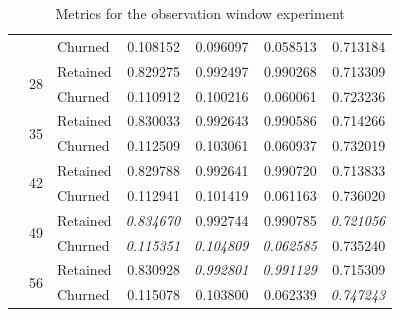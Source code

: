 \documentclass{kththesis}
\begin{document}
\begin{table}
\begin{tabular}{lllrrrr}
     &   & Churned &  0.108152 &  0.096097 &   0.058513 &  0.713184 \\
\cline{2-7}
     & \multirow{2}{*}{28} & Retained &  0.829275 &  0.992497 &   0.990268 &  0.713309 \\
     &   & Churned &  0.110912 &  0.100216 &   0.060061 &  0.723236 \\
\cline{2-7}
     & \multirow{2}{*}{35} & Retained &  0.830033 &  0.992643 &   0.990586 &  0.714266 \\
     &   & Churned &  0.112509 &  0.103061 &   0.060937 &  0.732019 \\
\cline{2-7}
     & \multirow{2}{*}{42} & Retained &  0.829788 &  0.992641 &   0.990720 &  0.713833 \\
     &   & Churned &  0.112941 &  0.101419 &   0.061163 &  0.736020 \\
\cline{2-7}
     & \multirow{2}{*}{49} & Retained &  \textit{0.834670} &  0.992744 &   0.990785 &  \textit{0.721056} \\
     &   & Churned &  \textit{0.115351} &  \textit{0.104809} &   \textit{0.062585} &  0.735240 \\
\cline{2-7}
     & \multirow{2}{*}{56} & Retained &  0.830928 &  \textit{0.992801} &   \textit{0.991129} &  0.715309 \\
     &   & Churned &  0.115078 &  0.103800 &   0.062339 &  \textit{0.747243} \\
\bottomrule
\end{tabular}
\caption{Metrics for the observation window experiment}
\label{tab:obs_window}
\end{table}

\end{document}
